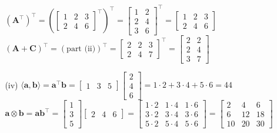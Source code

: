 \documentclass[11pt,letterpaper]{article}
\begin{document}
\begin{enumerate}
\begin{enumerate}
\begin{enumerate}
              $(\mathbf{A}^{\top})^{\top} = \left(\begin{bmatrix} 1 & 2 & 3 \\ 2 & 4 & 6 \end{bmatrix}^\top\right)^{\top} = \begin{bmatrix} 1 & 2 \\ 2 & 4 \\ 3 & 6 \end{bmatrix}^\top = \begin{bmatrix} 1 & 2 & 3 \\ 2 & 4 & 6 \end{bmatrix}$\\
              $(\mathbf{A} + \mathbf{C})^\top = \left(\text{part (ii)}\right)^\top = \begin{bmatrix} 2 & 2 & 3 \\ 2 & 4 & 7 \end{bmatrix}^\top = \begin{bmatrix} 2 & 2 \\ 2 & 4 \\ 3 & 7 \end{bmatrix}$
\item [(iv)] $\langle\mathbf{a}, \mathbf{b}\rangle = \mathbf{a}^\top\mathbf{b} = \begin{bmatrix} 1 & 3 & 5 \end{bmatrix} \begin{bmatrix} 2 \\ 4 \\ 6 \end{bmatrix} = 1 \cdot 2 + 3 \cdot 4 + 5 \cdot 6 = 44$\\
             $\mathbf{a} \otimes \mathbf{b} = \mathbf{a}\mathbf{b}^\top = \begin{bmatrix} 1 \\ 3 \\ 5 \end{bmatrix} \begin{bmatrix} 2 & 4 & 6 \end{bmatrix} = \begin{bmatrix} 1 \cdot 2 & 1 \cdot 4 & 1 \cdot 6 \\ 3 \cdot 2 & 3 \cdot 4 & 3 \cdot 6 \\ 5 \cdot 2 & 5 \cdot 4 & 5 \cdot 6 \end{bmatrix} = \begin{bmatrix} 2 & 4 & 6 \\ 6 & 12 & 18 \\ 10 & 20 & 30 \end{bmatrix}$\\

\end{enumerate}
\end{enumerate}
\end{enumerate}
\end{document}
